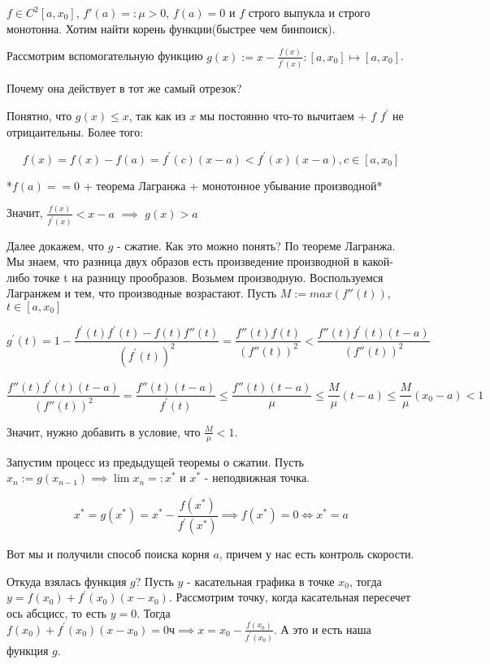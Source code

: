 \begin{example} \thmslashn
	
	$f \in C^2[a, x_0]$, $f'(a) =: \mu > 0$, $f(a) = 0$ и $f$ строго выпукла и строго монотонна. Хотим найти корень функции(быстрее чем бинпоиск).
	
	Рассмотрим вспомогательную функцию $g(x) := x - \frac{f(x)}{f^\prime(x)} : [a, x_0] \mapsto [a, x_0]$.
	
	Почему она действует в тот же самый отрезок?
	
	Понятно, что $g(x) \le x$, так как из $x$ мы постоянно что-то вычитаем + $f$ $f^\prime$ не отрицаительны. Более того:
	
	\[
	f(x) = f(x) - f(a) = f^\prime(c)(x - a) < f^\prime(x)(x - a), c \in [a, x_0]
	\]
	
	*$f(a) == 0$ + теорема Лагранжа + монотонное убывание производной*
	
	Значит, $\frac{f(x)}{f^\prime(x)} < x - a$ $\implies$ $g(x) > a$
	
	Далее докажем, что $g$ - сжатие. Как это можно понять? По теореме Лагранжа. Мы знаем, что разница двух образов есть произведение производной в какой-либо точке t на разницу прообразов. Возьмем производную. Воспользуемся Лагранжем и тем, что производные возрастают. Пусть $M := max(f''(t))$, $t \in [a, x_0]$
	
	
	\[
	g^\prime(t) = 
	1 - \frac{f^\prime(t)f^\prime(t) - f(t) f''(t)}{(f^\prime(t))^2}
	=
	\frac{f''(t) f(t)}{(f''(t))^2} 
	<
	\frac{f''(t) f^\prime(t)(t  - a)}{(f''(t))^2}
	\]
	
	\[
	\frac{f''(t) f^\prime(t)(t  - a)}{(f''(t))^2}
	=
	\frac{f''(t)(t-a)}{f^{\prime}(t)} \le
	\frac{f''(t)(t-a)}{\mu}
	\le
	\frac{M}{\mu}(t-a)
	\le
	\frac{M}{\mu}(x_0-a)
	< 1
	\]
	
	Значит, нужно добавить в условие, что $\frac{M}{\mu} < 1$.
	
	Запустим процесс из предыдущей теоремы о сжатии. Пусть $x_n := g(x_{n - 1}) \implies \lim x_n = :x^*$ и $x^*$ - неподвижная точка.
	
	\[
	x^* = g(x^*) = x^* - \frac{f(x^*)}{f^\prime(x^*)} \implies f(x^*) = 0 \iff x^* = a
	\]
	
	Вот мы и получили способ поиска корня $a$, причем у нас есть контроль скорости.
	
\end{example}

\begin{remark} \thmslashn
	
	Откуда взялась функция $g$? Пусть $y$ - касательная графика в точке $x_0$, тогда $y = f(x_0) + f^\prime(x_0)(x - x_0)$. Рассмотрим точку, когда касательная пересечет ось абсцисс, то есть $y = 0$. Тогда  $f(x_0) + f^\prime(x_0)(x - x_0) = 0ч	 \implies x = x_0 - \frac{f(x_0)}{f^\prime(x_0)}$. А это и есть наша функция $g$.
\end{remark}